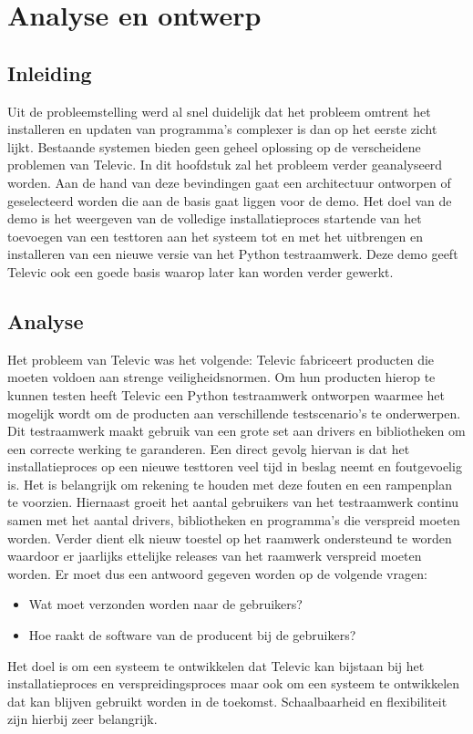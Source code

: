 \chapter{Analyse en ontwerp}\label{sec:anaEnOntwerp}
\section{Inleiding}
Uit de probleemstelling werd al snel duidelijk dat het probleem omtrent het installeren en updaten van programma's complexer is dan op het eerste zicht lijkt.
Bestaande systemen bieden geen geheel oplossing op de verscheidene problemen van Televic.
In dit hoofdstuk zal het probleem verder geanalyseerd worden.
Aan de hand van deze bevindingen gaat een architectuur ontworpen of geselecteerd worden die aan de basis gaat liggen voor de demo.
Het doel van de demo is het weergeven van de volledige installatieproces startende van het toevoegen van een testtoren aan het systeem tot en met het uitbrengen en installeren van een nieuwe versie van het Python testraamwerk.
Deze demo geeft Televic ook een goede basis waarop later kan worden verder gewerkt.

\section{Analyse}
Het probleem van Televic was het volgende:
Televic fabriceert producten die moeten voldoen aan strenge veiligheidsnormen.
Om hun producten hierop te kunnen testen heeft Televic een Python testraamwerk ontworpen waarmee het mogelijk wordt om de producten aan verschillende testscenario's te onderwerpen.
Dit testraamwerk maakt gebruik van een grote set aan drivers en bibliotheken om een correcte werking te garanderen.
Een direct gevolg hiervan is dat het installatieproces op een nieuwe testtoren veel tijd in beslag neemt en foutgevoelig is.
Het is belangrijk om rekening te houden met deze fouten en een rampenplan te voorzien.
Hiernaast groeit het aantal gebruikers van het testraamwerk continu samen met het aantal drivers, bibliotheken en programma's die verspreid moeten worden.
Verder dient elk nieuw toestel op het raamwerk ondersteund te worden waardoor er jaarlijks ettelijke releases van het raamwerk verspreid moeten worden.
Er moet dus een antwoord gegeven worden op de volgende vragen:
\begin{itemize}
\item Wat moet verzonden worden naar de gebruikers?
\item Hoe raakt de software van de producent bij de gebruikers?
\end{itemize}
Het doel is om een systeem te ontwikkelen dat Televic kan bijstaan bij het installatieproces en verspreidingsproces maar ook om een systeem te ontwikkelen dat kan blijven gebruikt worden in de toekomst.
Schaalbaarheid en flexibiliteit zijn hierbij zeer belangrijk.

